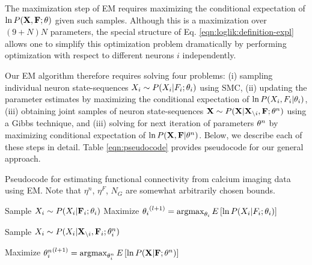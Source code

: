 The maximization step of EM requires maximizing the conditional expectation of $\ln P({\bf X}, {\bf F}; \mathbf{\theta})$ given such samples. Although this is a maximization over $(9+N)N$ parameters, the special structure of Eq. \eqref{eqn:loglik:definition-expl} allows one to simplify this optimization problem dramatically by performing optimization with respect to different neurons $i$ independently.  

Our EM algorithm therefore requires solving four problems: (i) sampling individual neuron state-sequences $X_i\sim P(X_i| F_i; \mathbf{\theta}_i)$ using SMC, (ii) updating the parameter estimates by maximizing the conditional expectation of $\ln P(X_i, F_i | \mathbf{\theta}_i)$,  (iii) obtaining joint samples of neuron state-sequences ${\bf X} \sim P({\bf X}| {\bf X}_{\backslash i}, {\bf F}; \mathbf{\theta}^n)$ using a Gibbs technique, and (iii) solving for next iteration of parameters $\mathbf{\theta}^n$ by maximizing conditional expectation of  $\ln P({\bf X}, {\bf F}| \mathbf{\theta}^n)$.  Below, we describe each of these steps in detail. Table \ref{eqn:pseudocode} provides pseudocode for our general approach.  

\begin{algorithm}
\caption{Pseudocode for estimating functional connectivity from calcium imaging data using EM. Note that $\eta^n$, $\eta^F$, $N_G$ are somewhat arbitrarily chosen bounds.}
\label{eqn:pseudocode}
\begin{algorithmic}
      \State Sample $X_i \sim P(X_i|{\bf F}_i; \mathbf{\theta}_i)$
      \State Maximize ${\mathbf{\theta}_i}^{(l+1)}=\operatorname*{argmax}_{\mathbf{\theta}_i} E\left[\ln P(X_i | F_i; \mathbf{\theta}_i) \right]$
    \EndWhile
  \EndFor
  
      \State Sample $X_i \sim P(X_i|{\bf X}_{\backslash i},{\bf F}_i; \mathbf{\theta}^n_i)$
    \EndFor
  \EndFor 

  \State Maximize ${\mathbf{\theta}^n_i}^{(l+1)}=\operatorname*{argmax}_{\mathbf{\theta}^n_i} E\left[\ln P({\bf X} | {\bf F}; \mathbf{\theta}^n)\right]$  
\EndWhile
\end{algorithmic}
\end{algorithm}
